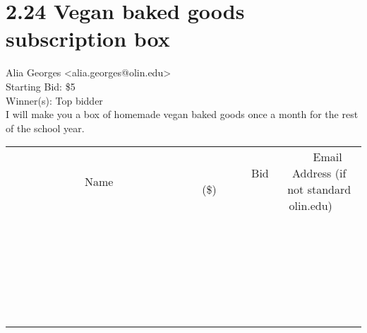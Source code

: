 \documentclass[11pt]{article}
\begin{document}
					\section*{2.24 Vegan baked goods subscription box}
					Alia Georges <alia.georges@olin.edu> \\
					Starting Bid: \$5 \\
					Winner(s): Top bidder \\
					I will make you a box of homemade vegan baked goods once a month for the rest of the school year. \\
					[6ex]
					\begin{tabular}{c c c}
						~~~~~~~~~~~~~Name~~~~~~~~~~~~~ & ~~~~~~~~~Bid (\$)~~~~~~~~~ & ~~~Email Address (if not standard olin.edu)~~~ \\
				
 & & \\
\hline
 & & \\
\hline
 & & \\
\hline
 & & \\
\hline
 & & \\
\hline
 & & \\
\hline
 & & \\
\hline
 & & \\
\hline
 & & \\
\hline
 & & \\
\hline
 & & \\
\hline
 & & \\
\hline
 & & \\
\hline
 & & \\
\hline
 & & \\
\hline
 & & \\
\hline
 & & \\
\hline
 & & \\
\hline
 & & \\
\hline
 & & \\
\hline
 & & \\
\hline
 & & \\
\hline
 & & \\
\hline
 & & \\
\hline
 & & \\
\hline
 & & \\
\hline
					\end{tabular}
					\clearpage
				
\end{document}
